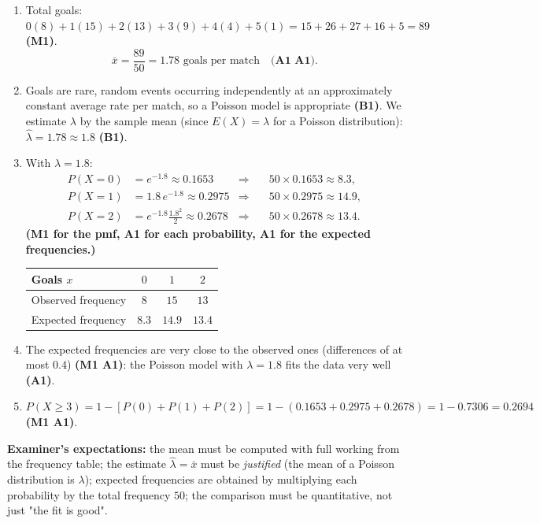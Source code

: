 \documentclass[11pt]{article}
\begin{document}
\begin{corrige}
\begin{enumerate}
\item Total goals: $0(8) + 1(15) + 2(13) + 3(9) + 4(4) + 5(1) = 15 + 26 + 27 + 16 + 5 = 89$ \textbf{(M1)}.
\[ \bar{x} = \frac{89}{50} = 1.78 \text{ goals per match} \quad \textbf{(A1 A1)}. \]
\item Goals are rare, random events occurring independently at an approximately constant average rate per match, so a Poisson model is appropriate \textbf{(B1)}. We estimate $\lambda$ by the sample mean (since $E(X) = \lambda$ for a Poisson distribution): $\hat{\lambda} = 1.78 \approx 1.8$ \textbf{(B1)}.
\item With $\lambda = 1.8$:
\begin{align*}
P(X = 0) &= e^{-1.8} \approx 0.1653 &\Rightarrow\quad &50 \times 0.1653 \approx 8.3,\\
P(X = 1) &= 1.8\,e^{-1.8} \approx 0.2975 &\Rightarrow\quad &50 \times 0.2975 \approx 14.9,\\
P(X = 2) &= e^{-1.8}\frac{1.8^2}{2} \approx 0.2678 &\Rightarrow\quad &50 \times 0.2678 \approx 13.4.
\end{align*}
\textbf{(M1 for the pmf, A1 for each probability, A1 for the expected frequencies.)}
\begin{center}
\begin{tabular}{|l|ccc|}
\hline
\rowcolor{popblueL} Goals $x$ & $0$ & $1$ & $2$ \\
\hline Observed frequency & $8$ & $15$ & $13$ \\
\hline Expected frequency & $8.3$ & $14.9$ & $13.4$ \\
\hline
\end{tabular}
\end{center}
\item The expected frequencies are very close to the observed ones (differences of at most $0.4$) \textbf{(M1 A1)}: the Poisson model with $\lambda = 1.8$ fits the data very well \textbf{(A1)}.
\item $P(X \geq 3) = 1 - [P(0) + P(1) + P(2)] = 1 - (0.1653 + 0.2975 + 0.2678) = 1 - 0.7306 = \mathbf{0.2694}$ \textbf{(M1 A1)}.
\end{enumerate}
\textbf{Examiner's expectations:} the mean must be computed with full working from the frequency table; the estimate $\hat{\lambda} = \bar{x}$ must be \emph{justified} (the mean of a Poisson distribution is $\lambda$); expected frequencies are obtained by multiplying each probability by the total frequency $50$; the comparison must be quantitative, not just "the fit is good".
\end{corrige}
\end{document}

